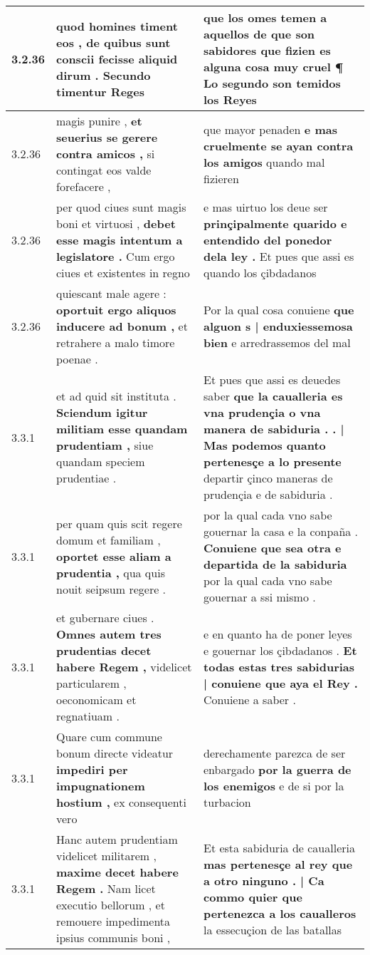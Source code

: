 \begin{tabular}{|p{1cm}|p{6.5cm}|p{6.5cm}|}
3.2.36 & quod homines timent eos , \textbf{ de quibus sunt conscii fecisse aliquid dirum . } Secundo timentur Reges & que los omes temen a aquellos de que son sabidores \textbf{ que fizien es alguna cosa muy cruel ¶ } Lo segundo son temidos los Reyes \\\hline
3.2.36 & magis punire , \textbf{ et seuerius se gerere contra amicos , } si contingat eos valde forefacere , & que mayor penaden \textbf{ e mas cruelmente se ayan contra los amigos } quando mal fizieren \\\hline
3.2.36 & per quod ciues sunt magis boni et virtuosi , \textbf{ debet esse magis intentum a legislatore . } Cum ergo ciues et existentes in regno & e mas uirtuo los deue ser \textbf{ prinçipalmente quarido e entendido del ponedor dela ley . } Et pues que assi es quando los çibdadanos \\\hline
3.2.36 & quiescant male agere : \textbf{ oportuit ergo aliquos inducere ad bonum , } et retrahere a malo timore poenae . & Por la qual cosa conuiene \textbf{ que alguon s | enduxiessemosa bien } e arredrassemos del mal \\\hline
3.3.1 & et ad quid sit instituta . \textbf{ Sciendum igitur militiam esse quandam prudentiam , } siue quandam speciem prudentiae . & Et pues que assi es deuedes saber \textbf{ que la caualleria es vna prudençia o vna manera de sabiduria . . | Mas podemos quanto pertenesçe a lo presente } departir çinco maneras de prudençia e de sabiduria . \\\hline
3.3.1 & per quam quis scit regere domum et familiam , \textbf{ oportet esse aliam a prudentia , } qua quis nouit seipsum regere . & por la qual cada vno sabe gouernar la casa e la conpaña . \textbf{ Conuiene que sea otra e departida de la sabiduria } por la qual cada vno sabe gouernar a ssi mismo . \\\hline
3.3.1 & et gubernare ciues . \textbf{ Omnes autem tres prudentias decet habere Regem , } videlicet particularem , oeconomicam et regnatiuam . & e en quanto ha de poner leyes e gouernar los çibdadanos . \textbf{ Et todas estas tres sabidurias | conuiene que aya el Rey . } Conuiene a saber . \\\hline
3.3.1 & Quare cum commune bonum directe videatur \textbf{ impediri per impugnationem hostium , } ex consequenti vero & derechamente parezca de ser enbargado \textbf{ por la guerra de los enemigos } e de si por la turbacion \\\hline
3.3.1 & Hanc autem prudentiam videlicet militarem , \textbf{ maxime decet habere Regem . } Nam licet executio bellorum , et remouere impedimenta ipsius communis boni , & Et esta sabiduria de caualleria \textbf{ mas pertenesçe al rey que a otro ninguno . | Ca commo quier que pertenezca a los caualleros } la essecuçion de las batallas \\\hline

\end{tabular}

